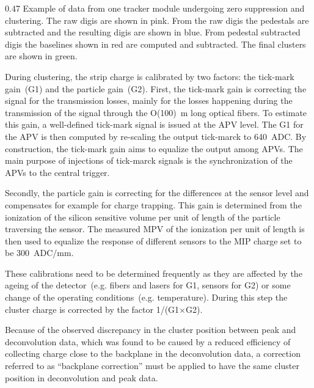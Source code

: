                  {0.47}       %
                 {Example of data from one tracker module undergoing zero suppression and clustering. The raw digis are shown in pink. From the raw digis the pedestals are subtracted and the resulting digis are shown in blue. From pedestal subtracted digis the baselines shown in red are computed and subtracted. The final clusters are shown in green.} %


During clustering, the strip charge is calibrated by two factors: the tick-mark gain~(G1) and the particle gain~(G2). First, the tick-mark gain is correcting the signal for the transmission losses, mainly for the losses happening during the transmission of the signal through the O(100)~m long optical fibers. To estimate this gain, a well-defined tick-mark signal is issued at the APV level. The G1 for the APV is then computed by re-scaling the output tick-marck to 640~ADC. By construction, the tick-mark gain aims to equalize the output among APVs. The main purpose of injections of tick-marck signals is the synchronization of the APVs to the central trigger.

Secondly, the particle gain is correcting for the differences at the sensor level and compensates for example for charge trapping. This gain is determined from the ionization of the silicon sensitive volume per unit of length of the particle traversing the sensor. The measured MPV of the ionization per unit of length is then used to equalize the response of different sensors to the MIP charge set to be 300~ADC/mm. 

These calibrations need to be determined frequently as they are affected by the ageing of the detector~(e.g. fibers and lasers for G1,  sensors for G2) or some change of the operating conditions~(e.g. temperature). During this step the cluster charge is corrected by the factor 1/(G1$\times$G2).

Because of the observed discrepancy in the cluster position between peak and deconvolution data, which was found to be caused by a reduced efficiency of collecting charge close to the backplane in the deconvolution data, a correction referred to as ``backplane correction'' must be applied to have the same cluster position in deconvolution and peak data.

